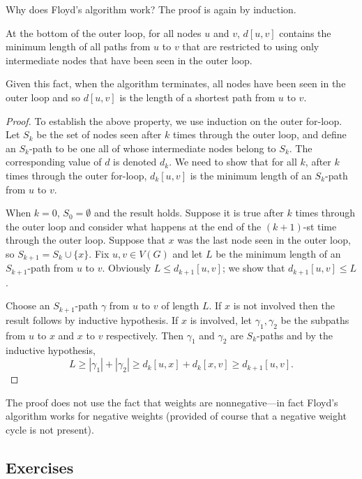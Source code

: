 Why does Floyd's algorithm work? The proof is again by induction.

\begin{Theorem}
\label{thm:floyd}
At the bottom of the outer  loop, for all nodes $u$ and $v$,
$d[u,v]$ contains the minimum length of all paths from $u$ to $v$ that
are restricted to using only intermediate nodes that have been seen in
the outer  loop. 
\end{Theorem}

\begin{note}
Given this fact, when the algorithm terminates, all nodes have been seen
in the outer  loop and so $d[u,v]$ is the length of a
shortest path from $u$ to $v$.
\end{note}

\begin{proof}
To establish the above property, we use induction on the outer for-loop.
Let $S_k$ be the set of nodes seen after $k$ times through the
outer loop, and define an $S_k$-path  to be one all of whose
intermediate nodes belong to $S_k$. The corresponding value of $d$ is 
denoted $d_k$. We need to show that for all $k$, after $k$ times through 
the outer for-loop, $d_k[u,v]$ is the minimum length of an $S_k$-path 
from $u$ to $v$. 

When $k=0$, $S_0 = \emptyset$ and the result holds. Suppose
it is true after $k$ times through the outer loop and consider what
happens at the end of the $(k+1)$-st time through the outer loop.
Suppose that $x$ was the last node seen in the outer loop, so $S_{k+1}=
S_k \cup \{x\}$. Fix $u, v\in V(G)$ and let $L$ be the minimum length of
an $S_{k+1}$-path from $u$ to $v$. Obviously $L \leq d_{k+1}[u,v]$; we
show that $d_{k+1}[u,v] \leq L$. 

Choose an $S_{k+1}$-path $\gamma$ from $u$ to $v$ of length $L$. If $x$
is not involved then the result follows by inductive hypothesis. If $x$
is involved, let $\gamma_1, \gamma_2$ be the subpaths from $u$ to $x$
and $x$ to $v$ respectively. Then $\gamma_1$ and $\gamma_2$ are
$S_k$-paths and by the inductive hypothesis, $$L \geq |\gamma_1| +
|\gamma_2| \geq d_k[u,x] + d_k[x,v] \geq d_{k+1}[u,v].$$
\end{proof}

The proof does not use the fact that weights are nonnegative---in
fact Floyd's algorithm works for negative weights (provided of course
that a negative weight cycle is not present).

\subsection*{Exercises}

